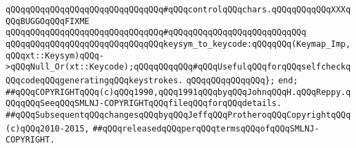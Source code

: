 \verb|qQQqqQQqqQQqqQQqqQQqqQQqqQQqqQQq#qQQqcontrolqQQqchars.qQQqqQQqqQQqXXXqQQqBUGGOqQQqFIXME|\newline
\verb|qQQqqQQqqQQqqQQqqQQqqQQqqQQqqQQq#qQQqqQQqqQQqqQQqqQQqqQQqqQQq|\newline
\verb|qQQqqQQqqQQqqQQqqQQqqQQqqQQqqQQqkeysym_to_keycode:qQQqqQQq(Keymap_Imp,qQQqxt::Keysym)qQQq->qQQqNull_Or(xt::Keycode);qQQqqQQqqQQq#qQQqUsefulqQQqforqQQqselfcheckqQQqcodeqQQqgeneratingqQQqkeystrokes.|\newline
\verb|qQQqqQQqqQQqqQQq};|\newline
\newline
\verb|end;|\newline
\newline
\newline
\verb|##qQQqCOPYRIGHTqQQq(c)qQQq1990,qQQq1991qQQqbyqQQqJohnqQQqH.qQQqReppy.qQQqqQQqSeeqQQqSMLNJ-COPYRIGHTqQQqfileqQQqforqQQqdetails.|\newline
\verb|##qQQqSubsequentqQQqchangesqQQqbyqQQqJeffqQQqProtheroqQQqCopyrightqQQq(c)qQQq2010-2015,|\newline
\verb|##qQQqreleasedqQQqperqQQqtermsqQQqofqQQqSMLNJ-COPYRIGHT.|\newline

